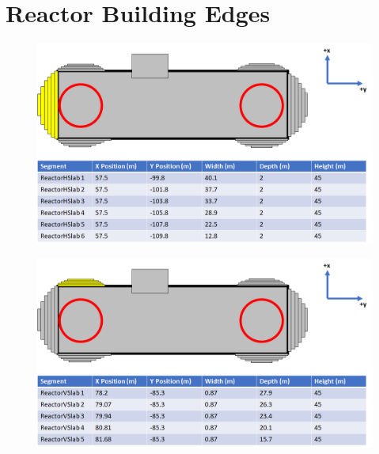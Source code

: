 
\chapter{Reactor Building Edges}

\begin{figure}[htbp]
 \centering
 \includegraphics[width=\linewidth]{Chapter5/Figs/wylfaRasterNew/Slabs1.png}
 \label{fig:slabs1}
\end{figure}

\begin{figure}[htbp]
 \centering
 \includegraphics[width=\linewidth]{Chapter5/Figs/wylfaRasterNew/Slabs3.png}
 \label{fig:slabs3}
\end{figure}

